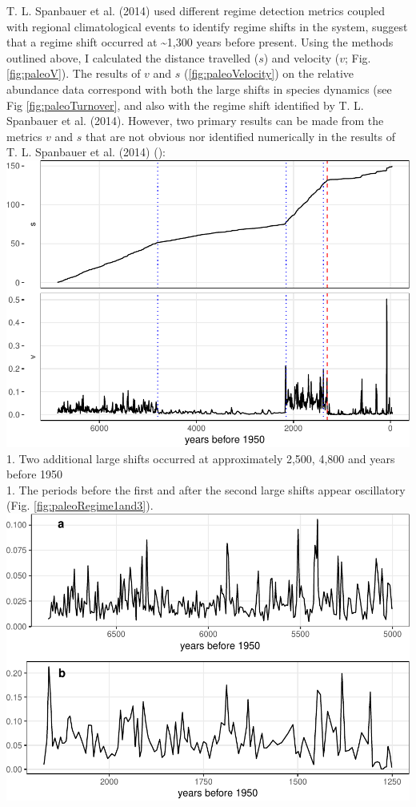 \documentclass[12pt,twoside,openany]{reedthesis}
\begin{document}
T. L. Spanbauer et al. (2014) used different regime detection metrics
coupled with regional climatological events to identify regime shifts in
the system, suggest that a regime shift occurred at
\textasciitilde{}1,300 years before present. Using the methods outlined
above, I calculated the distance travelled (\(s\)) and velocity (\(v\);
Fig. \ref{fig:paleoV}). The results of \(v\) and \(s\)
(\ref{fig:paleoVelocity}) on the relative abundance data correspond with
both the large shifts in species dynamics (see Fig
\ref{fig:paleoTurnover}, and also with the regime shift identified by T.
L. Spanbauer et al. (2014). However, two primary results can be made
from the metrics \(v\) and \(s\) that are not obvious nor identified
numerically in the results of T. L. Spanbauer et al. (2014) ():
\includegraphics{_myDissertation_files/figure-latex/paleoVelocity-1.pdf}
1. Two additional large shifts occurred at approximately 2,500, 4,800
and years before 1950\\
1. The periods before the first and after the second large shifts appear
oscillatory (Fig. \ref{fig:paleoRegime1and3}).\\
\includegraphics{_myDissertation_files/figure-latex/paleoRegime1and3-1.pdf}
\end{document}
